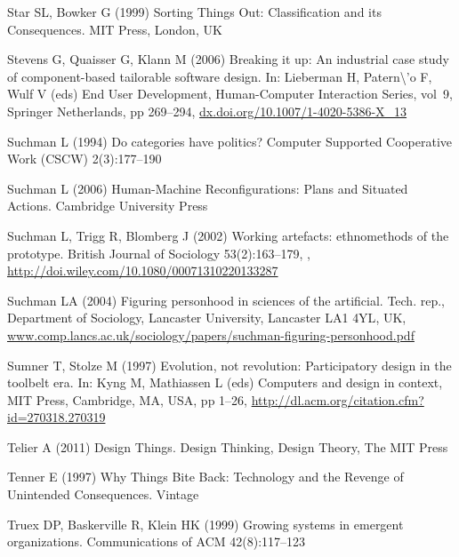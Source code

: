 \documentclass{article}
\begin{document}
\begin{thebibliography}{193}
Star SL, Bowker G (1999) Sorting Things Out: Classification and its
  Consequences. {MIT} Press, London, {UK}

Stevens G, Quaisser G, Klann M (2006) Breaking it up: An industrial case study
  of component-based tailorable software design. In: Lieberman H,
  Patern{\textbackslash}'{o} F, Wulf V (eds) End User Development,
  Human-Computer Interaction Series, vol~9, Springer Netherlands, pp 269--294,
  \urlprefix\url{dx.doi.org/10.1007/1-4020-5386-X_13}

Suchman L (1994) Do categories have politics? Computer Supported Cooperative
  Work {(CSCW)} 2(3):177--190

Suchman L (2006) Human-Machine Reconfigurations: Plans and Situated Actions.
  Cambridge University Press

Suchman L, Trigg R, Blomberg J (2002) Working artefacts: ethnomethods of the
  prototype. British Journal of Sociology 53(2):163--179,
  ,
  \urlprefix\url{http://doi.wiley.com/10.1080/00071310220133287}

Suchman LA (2004) Figuring personhood in sciences of the artificial. Tech.
  rep., Department of Sociology, Lancaster University, Lancaster {LA1} {4YL},
  {UK},
  \urlprefix\url{www.comp.lancs.ac.uk/sociology/papers/suchman-figuring-personhood.pdf}

Sumner T, Stolze M (1997) Evolution, not revolution: Participatory design in
  the toolbelt era. In: Kyng M, Mathiassen L (eds) Computers and design in
  context, {MIT} Press, Cambridge, {MA}, {USA}, pp 1--26,
  \urlprefix\url{http://dl.acm.org/citation.cfm?id=270318.270319}

Telier A (2011) Design Things. Design Thinking, Design Theory, The {MIT} Press

Tenner E (1997) Why Things Bite Back: Technology and the Revenge of Unintended
  Consequences. Vintage

Truex DP, Baskerville R, Klein HK (1999) Growing systems in emergent
  organizations. Communications of {ACM} 42(8):117--123


\end{thebibliography}
\end{document}
